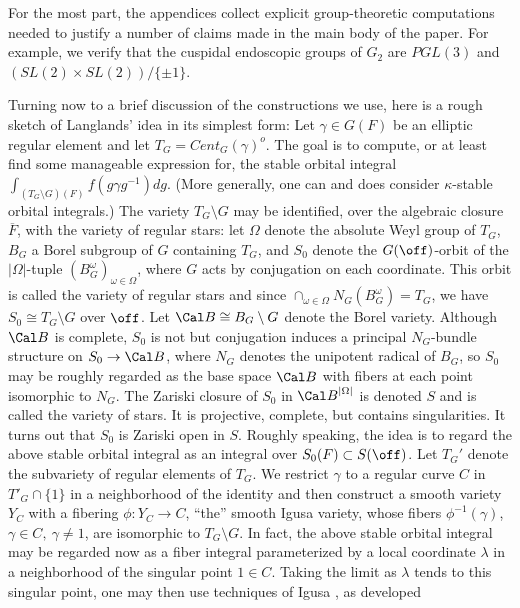 For the most part, the appendices collect explicit 
group-theoretic computations 
needed to justify a number of claims made in the main body of the paper. 
For example, we verify that the cuspidal endoscopic groups of $G_2$ are
$PGL(3)$ and $(SL(2)\times SL(2))/\{\pm 1\}$. 
\par
Turning now to a brief discussion of the constructions we use,
here is a rough sketch of Langlands' idea in its simplest form: 
Let $\gamma\in G(F)$ be an elliptic regular element and let
$T_G=Cent_G(\gamma)^o$. The goal is to compute,
or at least find some manageable expression for, the stable orbital
integral $\int_{(T_G\setminus G)(F)}f(g\gamma g^{-1})dg$. 
(More generally, one can and does consider $\kappa$-stable orbital 
integrals.) The variety $T_G\setminus G$
may be identified, over the algebraic closure
$\overline{F}$, with the variety of regular stars: let
$\Omega$ denote the absolute Weyl group of $T_G$, 
$B_G$ a Borel subgroup of $G$
containing $T_G$, and $S_0$ denote the $G(\off)$-orbit of the
$|\Omega|$-tuple $(B_G^\omega)_{\omega\in \Omega}$, where
$G$ acts by conjugation on each coordinate. This orbit is called the
variety of regular stars and since 
$\cap_{\omega\in \Omega}N_G(B_G^\omega)=T_G$,
we have $S_0\cong T_G\setminus G$ over $\off$. Let
${\Cal B}\cong B_G\setminus G$
denote the Borel variety. Although ${\Cal B}$ is complete,
$S_0$ is not but
conjugation induces a principal $N_G$-bundle structure on
$S_0\rightarrow {\Cal B}$, where $N_G$ denotes 
the unipotent radical of $B_G$, 
so $S_0$ may be roughly regarded as 
the base space ${\Cal B}$ with fibers at each point isomorphic to
$N_G$. The Zariski closure of
$S_0$ in ${\Cal B}^{|\Omega|}$ is denoted $S$ and is called the variety of 
stars. It is projective, complete, but contains singularities.
It turns out that $S_0$ is Zariski open in $S$. 
Roughly speaking, the idea is to regard the above stable orbital integral
as an integral over $S_0(F)\subset S(\off)$. Let $T_G'$
denote the subvariety of regular elements of $T_G$. We 
restrict $\gamma$ to a regular curve $C$ in $T'_G\cap \{1\}$
in a neighborhood of the identity and then construct a smooth variety $Y_C$
with a fibering $\phi:Y_C\rightarrow C$, ``the''
smooth Igusa variety, whose fibers
$\phi^{-1}(\gamma)$, $\gamma\in C,\ \gamma\not= 1$,
are isomorphic to $T_G\setminus G$. In fact, the above stable orbital integral
may be regarded now as a fiber integral parameterized by a 
local coordinate $\lambda$ in a neighborhood of the singular point $1\in C$. 
Taking the limit as $\lambda$ tends to this singular point,
one may then use techniques of Igusa \cite{I}, as developed
